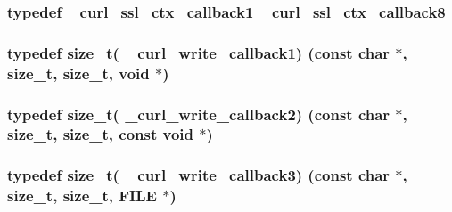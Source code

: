 \subsubsection[{\texorpdfstring{\+\_\+curl\+\_\+ssl\+\_\+ctx\+\_\+callback8}{_curl_ssl_ctx_callback8}}]{\setlength{\rightskip}{0pt plus 5cm}typedef {\bf \+\_\+curl\+\_\+ssl\+\_\+ctx\+\_\+callback1} {\bf \+\_\+curl\+\_\+ssl\+\_\+ctx\+\_\+callback8}}\hypertarget{typecheck-gcc_8h_aeea9c5ad63d27b7ce77216a872b737c6}{}\label{typecheck-gcc_8h_aeea9c5ad63d27b7ce77216a872b737c6}
\subsubsection[{\texorpdfstring{\+\_\+curl\+\_\+write\+\_\+callback1}{_curl_write_callback1}}]{\setlength{\rightskip}{0pt plus 5cm}typedef size\+\_\+t( \+\_\+curl\+\_\+write\+\_\+callback1) (const char $\ast$, size\+\_\+t, size\+\_\+t, void $\ast$)}\hypertarget{typecheck-gcc_8h_a6e919be022ec3a171fe5a52105753ba3}{}\label{typecheck-gcc_8h_a6e919be022ec3a171fe5a52105753ba3}
\subsubsection[{\texorpdfstring{\+\_\+curl\+\_\+write\+\_\+callback2}{_curl_write_callback2}}]{\setlength{\rightskip}{0pt plus 5cm}typedef size\+\_\+t( \+\_\+curl\+\_\+write\+\_\+callback2) (const char $\ast$, size\+\_\+t, size\+\_\+t, const void $\ast$)}\hypertarget{typecheck-gcc_8h_aad4fdd999d08cae171a468c1e97d55d4}{}\label{typecheck-gcc_8h_aad4fdd999d08cae171a468c1e97d55d4}
\subsubsection[{\texorpdfstring{\+\_\+curl\+\_\+write\+\_\+callback3}{_curl_write_callback3}}]{\setlength{\rightskip}{0pt plus 5cm}typedef size\+\_\+t( \+\_\+curl\+\_\+write\+\_\+callback3) (const char $\ast$, size\+\_\+t, size\+\_\+t, F\+I\+LE $\ast$)}\hypertarget{typecheck-gcc_8h_a94115d6760e3f7d4815177ca51903dce}{}\label{typecheck-gcc_8h_a94115d6760e3f7d4815177ca51903dce}
